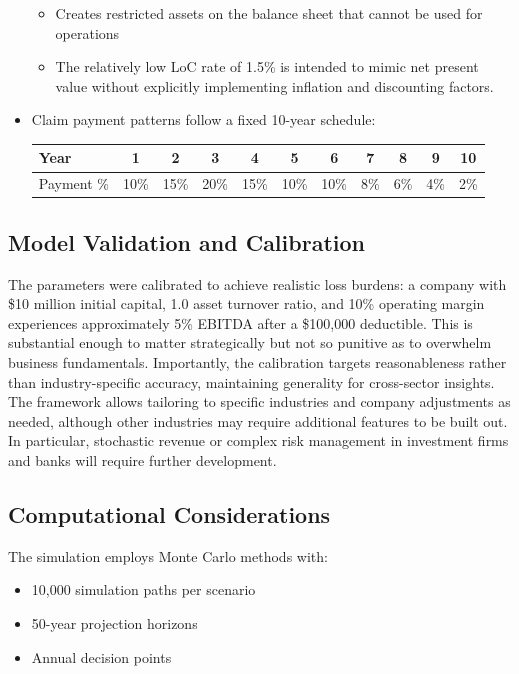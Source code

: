 \documentclass[11pt,letterpaper]{article}
\begin{document}
\begin{itemize}
\begin{itemize}[label=$\circ$]
            \item Creates restricted assets on the balance sheet that cannot be used for operations
            \item The relatively low LoC rate of 1.5\% is intended to mimic net present value without explicitly implementing inflation and discounting factors.
        \end{itemize}
    \item Claim payment patterns follow a fixed 10-year schedule:
        \begin{table}[H]
            \centering
            \begin{tabular}{lcccccccccc}
                \toprule
                Year & 1 & 2 & 3 & 4 & 5 & 6 & 7 & 8 & 9 & 10 \\
                \midrule
                Payment \% & 10\% & 15\% & 20\% & 15\% & 10\% & 10\% & 8\% & 6\% & 4\% & 2\% \\
                \bottomrule
            \end{tabular}
            \label{tab:payment_pattern}
        \end{table}
\end{itemize}

\subsection{Model Validation and Calibration}

The parameters were calibrated to achieve realistic loss burdens: a company with \$10 million initial capital, 1.0 asset turnover ratio, and 10\% operating margin experiences approximately 5\% EBITDA after a \$100,000 deductible. This is substantial enough to matter strategically but not so punitive as to overwhelm business fundamentals. Importantly, the calibration targets reasonableness rather than industry-specific accuracy, maintaining generality for cross-sector insights. The framework allows tailoring to specific industries and company adjustments as needed, although other industries may require additional features to be built out. In particular, stochastic revenue or complex risk management in investment firms and banks will require further development.

\subsection{Computational Considerations}

The simulation employs Monte Carlo methods with:
\begin{itemize}
    \item 10,000 simulation paths per scenario
    \item 50-year projection horizons
    \item Annual decision points
\end{itemize}
\end{document}
